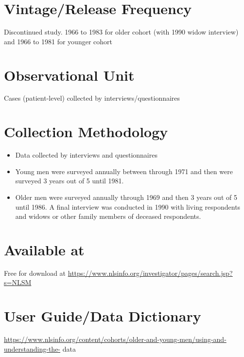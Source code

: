\documentclass[
]{book}
\providecommand{\tightlist}{%
  \setlength{\itemsep}{0pt}\setlength{\parskip}{0pt}}
\begin{document}
\hypertarget{vintagerelease-frequency-57}{%
\section{Vintage/Release Frequency}\label{vintagerelease-frequency-57}}

Discontinued study. 1966 to 1983 for older cohort (with 1990 widow interview) and 1966 to 1981 for younger cohort

\hypertarget{observational-unit-57}{%
\section{Observational Unit}\label{observational-unit-57}}

Cases (patient-level) collected by interviews/questionnaires

\hypertarget{collection-methodology-57}{%
\section{Collection Methodology}\label{collection-methodology-57}}

\begin{itemize}
\tightlist
\item
  Data collected by interviews and questionnaires
\item
  Young men were surveyed annually between through 1971 and then were surveyed 3 years out of 5 until 1981.
\item
  Older men were surveyed annually through 1969 and then 3 years out of 5 until 1986. A final interview was conducted in 1990 with living respondents and widows or other family members of deceased respondents.
\end{itemize}

\hypertarget{available-at-57}{%
\section{Available at}\label{available-at-57}}

Free for download at \url{https://www.nlsinfo.org/investigator/pages/search.jsp?s=NLSM}

\hypertarget{user-guidedata-dictionary-57}{%
\section{User Guide/Data Dictionary}\label{user-guidedata-dictionary-57}}

\url{https://www.nlsinfo.org/content/cohorts/older-and-young-men/using-and-understanding-the-} data
\end{document}
